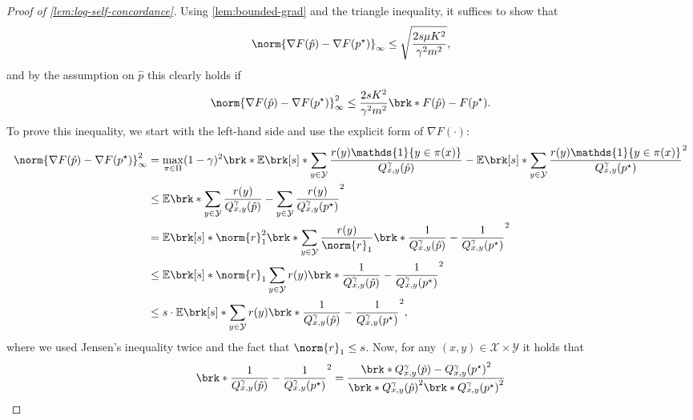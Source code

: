 \documentclass[11pt]{article}
\renewcommand{\ind}[1]{\mathds{1}\{#1\}}
\newcommand{\bbE}{\boldsymbol{\mathbb{E}}}
\renewcommand{\E}{\bbE}
\newcommand{\yprobg}[3]{Q^\gamma_{#2,#3}(#1)}
\newcommand{\rew}{r}
\newcommand{\lab}{y}
\newcommand{\calX}{\mathcal{X}}
\newcommand{\calY}{\mathcal{Y}}
\newcommand{\obj}{F}
\theoremstyle{plain}
\begin{document}
\begin{proof}[Proof of \cref{lem:log-self-concordance}]
    Using \cref{lem:bounded-grad} and the triangle inequality, it suffices to show that 
    \begin{align*}
        \norm{\nabla \obj(\hat p) - \nabla \obj(p^\star)}_\infty \leq \sqrt{\frac{2 s \mu K^2}{\gamma^2 m^2}},
    \end{align*}
    and by the assumption on $\hat p$ this clearly holds if
    \begin{align*}
        \norm{\nabla \obj(\hat p) - \nabla \obj(p^\star)}^2_\infty \leq \frac{2 s K^2}{\gamma^2 m^2} \brk*{\obj(\hat p) - \obj(p^\star)}.
    \end{align*}
    To prove this inequality, we start with the left-hand side and use the explicit form of $\nabla \obj(\cdot)$:
    \begin{align}
    \label{eqn:sq-self-concordance}
        \norm{\nabla \obj(\hat p) - \nabla \obj(p^\star)}^2_\infty
        &=
        \max_{\pi \in \Pi} (1-\gamma)^2\brk*{\E \brk[s]*{\sum_{\lab \in \calY} \frac{\rew(\lab) \ind{\lab \in \pi(x)}}{\yprobg{\hat p}{x}{\lab}}} - \E \brk[s]*{\sum_{\lab \in \calY} \frac{\rew(\lab) \ind{\lab \in \pi(x)}}{\yprobg{p^\star}{x}{\lab}}}}^2 \nonumber\\
        &\leq
        \E \brk*{\sum_{\lab \in \calY} \frac{\rew(\lab) }{\yprobg{\hat p}{x}{\lab}} - \sum_{\lab \in \calY} \frac{\rew(\lab) }{\yprobg{p^\star}{x}{\lab}}}^2 \nonumber\\
        &=
        \E \brk[s]*{\norm{\rew}^2_1 \brk*{\sum_{\lab \in \calY} \frac{\rew(\lab)}{\norm{r}_1} \brk*{\frac{1}{\yprobg{\hat p}{x}{\lab}} - \frac{1}{\yprobg{p^\star}{x}{\lab}}}}^2} \nonumber\\
        &\leq
        \E \brk[s]*{\norm{\rew}_1 \sum_{\lab \in \calY} \rew(\lab) \brk*{\frac{1}{\yprobg{\hat p}{x}{\lab}} - \frac{1}{\yprobg{p^\star}{x}{\lab}}}^2} \nonumber\\
        &\leq
        s \cdot \E \brk[s]*{\sum_{\lab \in \calY} \rew(\lab) \brk*{\frac{1}{\yprobg{\hat p}{x}{\lab}} - \frac{1}{\yprobg{p^\star}{x}{\lab}}}^2},
    \end{align}
    where we used Jensen's inequality twice and the fact that $\norm{\rew}_1 \leq s$. Now, for any $(x,\lab) \in \calX \times \calY$ it holds that
    \begin{align*}
        \brk*{\frac{1}{\yprobg{\hat p}{x}{\lab}} - \frac{1}{\yprobg{p^\star}{x}{\lab}}}^2
        &=
        \frac{\brk*{\yprobg{\hat p}{x}{\lab} - \yprobg{p^\star}{x}{\lab}}^2}{\brk*{\yprobg{\hat p}{x}{\lab}}^2 \brk*{\yprobg{p^\star}{x}{\lab}}^2} \\

\end{align*}
\end{proof}
\end{document}
